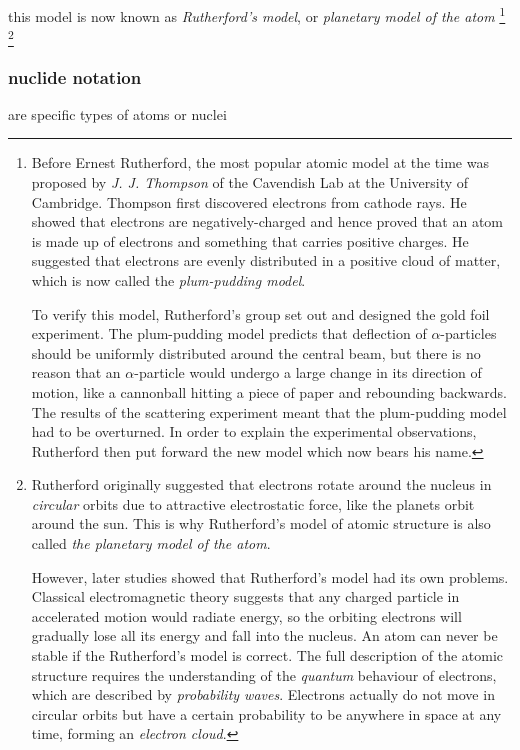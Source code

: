 this model is now known as \emph{Rutherford's model}, or \emph{planetary model of the atom}
\footnote{
	Before Ernest Rutherford, the most popular atomic model at the time was proposed by \emph{J. J. Thompson} of the Cavendish Lab at the University of Cambridge. Thompson first discovered electrons from cathode rays. He showed that electrons are negatively-charged and hence proved that an atom is made up of electrons and something that carries positive charges. He suggested that electrons are evenly distributed in a positive cloud of matter, which is now called the \emph{plum-pudding model}.
	
	To verify this model, Rutherford's group set out and designed the gold foil experiment. The plum-pudding model predicts that deflection of $\alpha$-particles should be uniformly distributed around the central beam, but there is no reason that an $\alpha$-particle would undergo a large change in its direction of motion, like a cannonball hitting a piece of paper and rebounding backwards. The results of the scattering experiment meant that the plum-pudding model had to be overturned. In order to explain the experimental observations, Rutherford then put forward the new model which now bears his name.}
\footnote{
	 Rutherford originally suggested that electrons rotate around the nucleus in \emph{circular} orbits due to attractive electrostatic force, like the planets orbit around the sun. This is why Rutherford's model of atomic structure is also called \emph{the planetary model of the atom}.
	 
	 However, later studies showed that Rutherford's model had its own problems. Classical electromagnetic theory suggests that any charged particle in accelerated motion would radiate energy, so the orbiting electrons will gradually lose all its energy and fall into the nucleus. An atom can never be stable if the Rutherford's model is correct. The full description of the atomic structure requires the understanding of the \emph{quantum} behaviour of electrons, which are described by \emph{probability waves}. Electrons actually do not move in circular orbits but have a certain probability to be anywhere in space at any time, forming an \emph{electron cloud}.
 }




\subsubsection{nuclide notation}

 are specific types of atoms or nuclei

